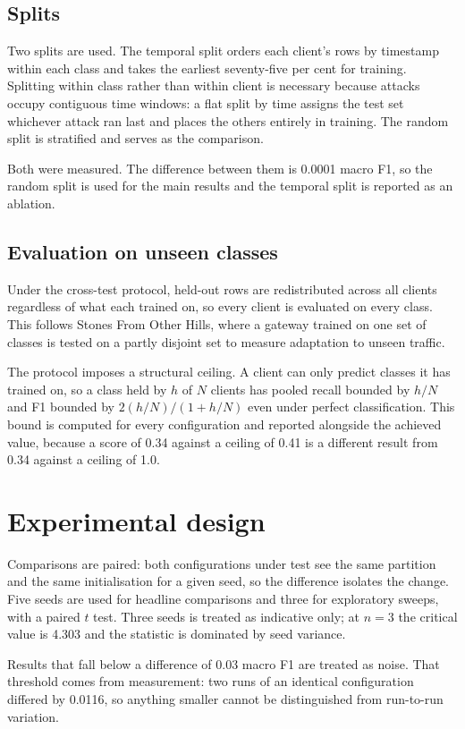 \subsection{Splits}

Two splits are used. The temporal split orders each client's rows by timestamp
within each class and takes the earliest seventy-five per cent for training.
Splitting within class rather than within client is necessary because attacks
occupy contiguous time windows: a flat split by time assigns the test set
whichever attack ran last and places the others entirely in training. The random
split is stratified and serves as the comparison.

Both were measured. The difference between them is 0.0001 macro F1, so the
random split is used for the main results and the temporal split is reported as
an ablation.

\subsection{Evaluation on unseen classes}

Under the cross-test protocol, held-out rows are redistributed across all
clients regardless of what each trained on, so every client is evaluated on
every class. This follows Stones From Other Hills, where a gateway trained on
one set of classes is tested on a partly disjoint set to measure adaptation to
unseen traffic.

The protocol imposes a structural ceiling. A client can only predict classes it
has trained on, so a class held by $h$ of $N$ clients has pooled recall bounded
by $h/N$ and F1 bounded by $2(h/N)/(1 + h/N)$ even under perfect
classification. This bound is computed for every configuration and reported
alongside the achieved value, because a score of 0.34 against a ceiling of 0.41
is a different result from 0.34 against a ceiling of 1.0.

\section{Experimental design}
\label{sec:experimental-design}

Comparisons are paired: both configurations under test see the same partition
and the same initialisation for a given seed, so the difference isolates the
change. Five seeds are used for headline comparisons and three for exploratory
sweeps, with a paired $t$ test. Three seeds is treated as indicative only; at
$n=3$ the critical value is 4.303 and the statistic is dominated by seed
variance.

Results that fall below a difference of 0.03 macro F1 are treated as noise. That
threshold comes from measurement: two runs of an identical configuration
differed by 0.0116, so anything smaller cannot be distinguished from run-to-run
variation.
